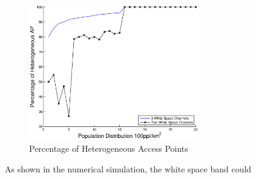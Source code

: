 \begin{figure}
\centering
\includegraphics[width=74mm]{figures/percentage}
\vspace{-0.1in}
\caption{Percentage of Heterogeneous Access Points}                                                                 
\label{fig:heappercentage}
\vspace{-0.1in}
\end{figure}

As shown in the numerical simulation, the white space band could 






